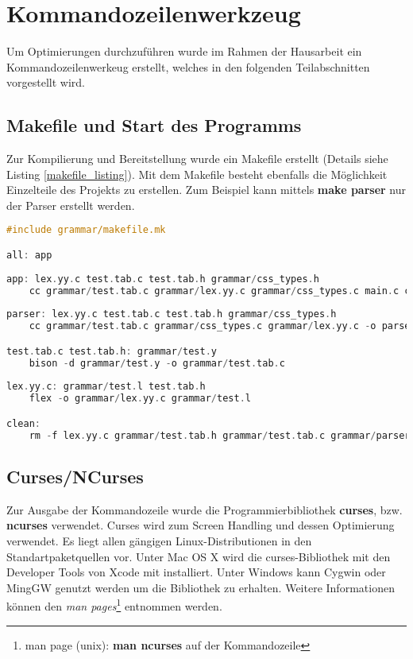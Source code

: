 \section{Kommandozeilenwerkzeug}
Um Optimierungen durchzuführen wurde im Rahmen der Hausarbeit ein Kommandozeilenwerkeug erstellt, welches in den folgenden Teilabschnitten vorgestellt wird.

\subsection{Makefile und Start des Programms}
Zur Kompilierung und Bereitstellung wurde ein Makefile erstellt (Details siehe Listing \ref{makefile_listing}). Mit dem Makefile besteht ebenfalls die Möglichkeit Einzelteile des Projekts zu erstellen. Zum Beispiel kann mittels \textbf{make parser} nur der Parser erstellt werden.
\begin{lstlisting}[label=makefile_listing,language=C, caption=Makefile]
#include grammar/makefile.mk

all: app
	
app: lex.yy.c test.tab.c test.tab.h grammar/css_types.h
	cc grammar/test.tab.c grammar/lex.yy.c grammar/css_types.c main.c cli_parse.c css_merge.c guiCSS.c optimizer.c output.c -lncurses -o optimCSS
	
parser: lex.yy.c test.tab.c test.tab.h grammar/css_types.h
	cc grammar/test.tab.c grammar/css_types.c grammar/lex.yy.c -o parser

test.tab.c test.tab.h: grammar/test.y
	bison -d grammar/test.y -o grammar/test.tab.c
            
lex.yy.c: grammar/test.l test.tab.h
	flex -o grammar/lex.yy.c grammar/test.l

clean: 
	rm -f lex.yy.c grammar/test.tab.h grammar/test.tab.c grammar/parser optimCSS
\end{lstlisting}


\subsection{Curses/NCurses}

Zur Ausgabe der Kommandozeile wurde die Programmierbibliothek \textbf{curses}, bzw. \textbf{ncurses} verwendet. Curses wird zum Screen Handling und dessen Optimierung verwendet. Es liegt allen gängigen Linux-Distributionen in den Standartpaketquellen vor. Unter Mac OS X wird die curses-Bibliothek mit den Developer Tools von Xcode mit installiert. Unter Windows kann Cygwin oder MingGW genutzt werden um die Bibliothek zu erhalten. Weitere Informationen können den \textit{man pages}\footnote{man page (unix): \textbf{man ncurses} auf der Kommandozeile} entnommen werden. 

